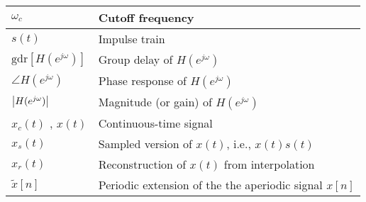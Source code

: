 \begin{xltabular}{\textwidth}{XX}
	\(\omega_c\) \cite{ingleDigitalSignalProcessing2000}                                                                                    & Cutoff frequency                                                                                                                                                    \\ \hline
	\(s(t)\)                                                                                        & Impulse train                                                                                                                                                                                               \\ \hline
	\(\textrm{gdr}\left[ H (e^{j\omega}) \right]\) \cite{oppenheimDiscreteTimeSignalProcessing2009} & Group delay of \(H (e^{j\omega})\)                                                                                                                                                                          \\ \hline
	\(\angle H (e^{j\omega})\) \cite{oppenheimDiscreteTimeSignalProcessing2009}                     & Phase response of \(H (e^{j\omega})\)                                                                                                                                                                       \\ \hline
	\(\abs{H (e^{j\omega})}\) \cite{oppenheimDiscreteTimeSignalProcessing2009}                      & Magnitude (or gain) of \(H (e^{j\omega})\)                                                                                                                                                                  \\ \hline
	\(x_c(t)\) \cite{oppenheimDiscreteTimeSignalProcessing2009}, \(x(t)\)                           & Continuous-time signal                                                                                                                                                                                      \\ \hline
	\(x_s(t)\)                                                                                      & Sampled version of \(x(t)\), i.e., \(x(t)s(t)\)                                                                                                                                                             \\ \hline
	\(x_r(t)\)                                                                                      & Reconstruction of \(x(t)\) from interpolation                                                                                                                                                               \\ \hline
	\(\tilde{x}[n]\)                                                                                & Periodic extension of the the aperiodic signal \(x[n]\)                                                                                                                                                     \\ \hline
\end{xltabular}
